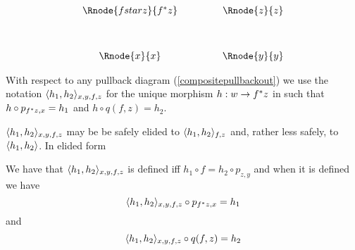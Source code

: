 \vspace{3mm}
\begin{center}
\begin{equation}
\label{compositepullbackout}
\begin{array}{cp{.9cm}c}
\Rnode{fstarz}{f^*z} & & \Rnode{z}{z}\\ [1.2cm]
\Rnode{x}{x}         & & \Rnode{y}{y}
\end{array}
\end{equation}
\end{center}
\newcommand{\pbpair}[2]{\tuple{#2}_{#1}}
With respect to any pullback diagram (\ref{compositepullbackout})
 we use the notation $\pbpair{x,y,f,z}{h_1,h_2}$  for the unique morphism   
$h:w \rightarrow f ^* z$ in  such that
$h \circ p_{f ^* z,x} = h_1$ and $h \circ q(f,z) = h_2$.\\
\begin{oldtt}
$\langle h_1,h_2\rangle_{x,y,f,z}$ may be be safely elided to $\langle h_1,h_2\rangle_{f,z}$ and, rather less safely, to $\langle h_1,h_2\rangle$.
In  elided form
\end{oldtt}
We  have that $\pbpair{x,y,f,z}{h_1,h_2}$ is defined iff $h_1 \circ f=h_2\circ p_{z,y}$
and when it is defined we have
\begin{equation}
\pbpair{x,y,f,z}{h_1,h_2} \circ p_{f^*z,x} = h_1
\end{equation}
and
\begin{equation}
\pbpair{x,y,f,z}{h_1,h_2} \circ q(f,z) = h_2
\end{equation}

